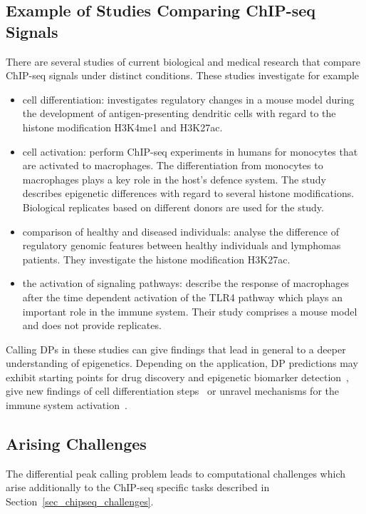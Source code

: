 \subsection{Example of Studies Comparing ChIP-seq Signals}
There are several studies of current biological and medical research that compare ChIP-seq signals under distinct conditions.
These studies investigate for example

\begin{itemize}
 \item cell differentiation: \cite{Lin2015} investigates regulatory changes in a mouse model during the development of antigen-presenting dendritic cells with regard to the histone modification H3K4me1 and H3K27ac.
 \item cell activation: \cite{Stunnenberg2014} perform ChIP-seq experiments in humans for monocytes that are activated to ma\-cro\-pha\-ges.
 The differentiation from monocytes to ma\-cro\-pha\-ges plays a key role in the host's defence system. 
 The study describes epigenetic differences with regard to several histone modifications.
 Biological replicates based on different donors are used for the study.
 \item comparison of healthy and diseased individuals: \cite{Koues2015} analyse the difference of regulatory genomic features between healthy individuals and lymphomas patients. 
 They investigate the histone modification H3K27ac.
 \item the activation of signaling pathways: \cite{kaikonnen2013} describe the response of macrophages after the time dependent activation of the TLR4 pathway which plays an important role in the immune system.
 Their study comprises a mouse model and does not provide replicates.
\end{itemize}

\noindent
Calling DPs in these studies can give findings that lead in general to a deeper understanding of epigenetics.
Depending on the application, DP predictions may exhibit starting points for drug discovery and epigenetic biomarker detection~\citep{Koues2015, Stunnenberg2014}, give new findings of cell differentiation steps~\citep{Lin2015} or unravel mechanisms for the immune system activation~\citep{kaikonnen2013}.



\subsection{Arising Challenges}
\label{sec_challenges_dpcp}
The differential peak calling problem leads to computational challenges which arise additionally to the ChIP-seq specific tasks described in Section~\ref{sec_chipseq_challenges}.

